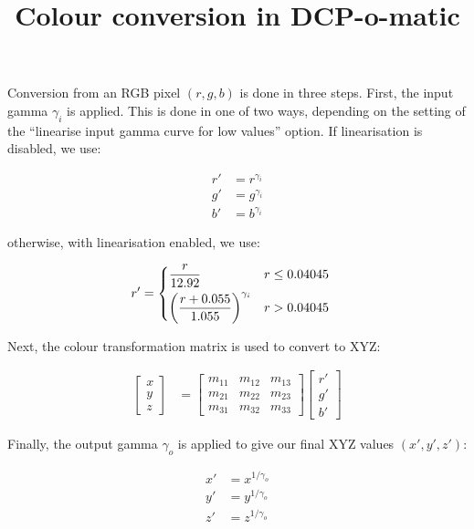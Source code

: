 \documentclass{article}
\title{Colour conversion in DCP-o-matic}
\author{}
\date{}
\begin{document}
\maketitle

Conversion from an RGB pixel $(r, g, b)$ is done in three steps.
First, the input gamma $\gamma_i$ is applied.  This is done in one of
two ways, depending on the setting of the ``linearise input gamma
curve for low values'' option.  If linearisation is disabled, we use:

\begin{align*}
r' &= r^{\gamma_i} \\
g' &= g^{\gamma_i} \\
b' &= b^{\gamma_i}
\end{align*}

otherwise, with linearisation enabled, we use:

\begin{align*}
r' &= \begin{dcases}
\frac{r}{12.92} & r \leq 0.04045 \\
\left(\frac{r + 0.055}{1.055}\right)^{\gamma_i} & r > 0.04045
\end{dcases}
\end{align*}

Next, the colour transformation matrix is used to convert to XYZ:

\begin{align*}
\left[\begin{array}{c}
x \\
y \\
z
\end{array}\right] &=
\left[\begin{array}{ccc}
m_{11} & m_{12} & m_{13} \\
m_{21} & m_{22} & m_{23} \\
m_{31} & m_{32} & m_{33}
\end{array}\right]
\left[\begin{array}{c}
r' \\
g' \\
b'
\end{array}\right]
\end{align*}

Finally, the output gamma $\gamma_o$ is applied to give our final XYZ values $(x', y', z')$:

\begin{align*}
x' &= x^{1/\gamma_o} \\
y' &= y^{1/\gamma_o} \\
z' &= z^{1/\gamma_o} \\
\end{align*}
\end{document}
